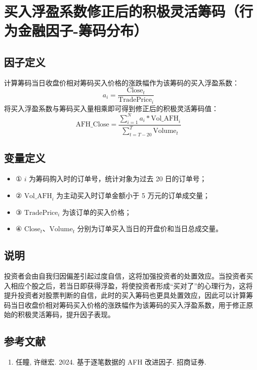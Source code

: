 \documentclass{article}
\begin{document}
\section{买入浮盈系数修正后的积极灵活筹码（行为金融因子-筹码分布）}

\subsection{因子定义}
计算筹码当日收盘价相对筹码买入价格的涨跌幅作为该筹码的买入浮盈系数：
\begin{equation}
    a_i = \frac{\mathrm{Close}_t}{\mathrm{TradePrice}_i}
\end{equation}
将买入浮盈系数与筹码买入量相乘即可得到修正后的积极灵活筹码值：
\begin{equation}
    \mathrm{AFH\_Close} = \frac{\sum_{i=1}^N a_i * \mathrm{Vol\_AFH}_i}{\sum_{t=T-20}^T \mathrm{Volume}_t}
\end{equation}

\subsection{变量定义}
\begin{itemize}
    \item ① \(i\) 为筹码购入时的订单号，统计对象为过去 20 日的订单号；
    \item ② \( \mathrm{Vol\_AFH}_i \) 为主动买入时订单金额小于 5 万元的订单成交量；
    \item ③ \( \mathrm{TradePrice}_i \) 为该订单的买入价格；
    \item ④ \( \mathrm{Close}_t \)、\( \mathrm{Volume}_t \) 分别为订单买入当日的开盘价和当日总成交量。
\end{itemize}

\subsection{说明}
投资者会由自我归因偏差引起过度自信，这将加强投资者的处置效应。当投资者买入相应个股之后，若当日即获得浮盈，将使投资者形成“买对了”的心理行为，这将提升投资者对股票判断的自信，此时的买入筹码也更具处置效应，因此可以计算筹码当日收盘价相对筹码买入价格的涨跌幅作为该筹码的买入浮盈系数，用于修正原始的积极灵活筹码，提升因子表现。

\subsection{参考文献}
\begin{enumerate}
    \item 任瞳, 许继宏. 2024. 基于逐笔数据的 AFH 改进因子. 招商证券.
\end{enumerate}
\end{document}
